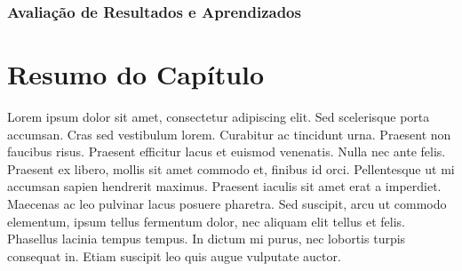 
\subsubsection*{Avaliação de Resultados e Aprendizados}

\section{Resumo do Capítulo}
\label{prop-resumo}

Lorem ipsum dolor sit amet, consectetur adipiscing elit. Sed scelerisque porta accumsan. Cras sed vestibulum lorem. Curabitur ac tincidunt urna. Praesent non faucibus risus. Praesent efficitur lacus et euismod venenatis. Nulla nec ante felis. Praesent ex libero, mollis sit amet commodo et, finibus id orci. Pellentesque ut mi accumsan sapien hendrerit maximus. Praesent iaculis sit amet erat a imperdiet. Maecenas ac leo pulvinar lacus posuere pharetra. Sed suscipit, arcu ut commodo elementum, ipsum tellus fermentum dolor, nec aliquam elit tellus et felis. Phasellus lacinia tempus tempus. In dictum mi purus, nec lobortis turpis consequat in. Etiam suscipit leo quis augue vulputate auctor.